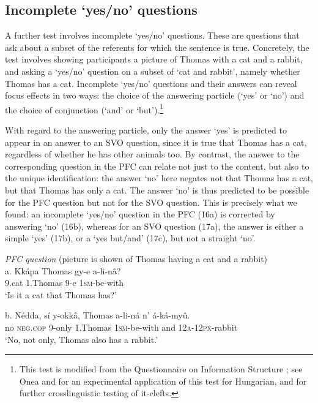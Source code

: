 \documentclass[output=paper]{langsci/langscibook}
\begin{document}
\subsection{Incomplete ‘yes/no’ questions} %

A further test involves incomplete ‘yes/no’ questions. These are questions that ask about a subset of the referents for which the sentence is true. Concretely, the test involves showing participants a picture of Thomas with a cat and a rabbit, and asking a ‘yes/no’ question on a subset of ‘cat and rabbit’, namely whether Thomas has a cat. Incomplete ‘yes/no’ questions and their answers can reveal focus effects in two ways: the choice of the answering particle (‘yes’ or ‘no’) and the choice of conjunction (‘and’ or ‘but’).\footnote{This test is modified from the Questionnaire on Information Structure \citep{SkopeteasEtAl2006}; see Onea and \citet{Beaver2011} for an experimental application of this test for Hungarian, and \citet{DestruelEtAl2014} for further crosslinguistic testing of it-clefts.}

  With regard to the answering particle, only the answer ‘yes’ is predicted to appear in an answer to an SVO question, since it is true that Thomas has a cat, regardless of whether he has other animals too. By contrast, the answer to the corresponding question in the PFC can relate not just to the content, but also to the unique identification: the answer ‘no’ here negates not that Thomas has a cat, but that Thomas has only a cat. The answer ‘no’ is thus predicted to be possible for the PFC question but not for the SVO question. This is precisely what we found: an incomplete ‘yes/no’ question in the PFC (16a) is corrected by answering ‘no’ (16b), whereas for an SVO question (17a), the answer is either a simple ‘yes’ (17b), or a ‘yes but/and’ (17c), but not a straight ‘no’. 

\ea
{\textit{PFC question}}
       (picture is shown of Thomas having a cat and a rabbit)\\
\gll   a.  Kkápa  Thomas  gy-e  a-li-nâ?\\
         9.cat  1.Thomas  9-e  \textsc{1sm}-be-with\\
\glt     ‘Is it a cat that Thomas has?’
\z

\ea
\gll   b.  Nédda,  sí    y-okkâ,  Thomas  a-li-ná    n’  á-ká-myû.\\
         no  \textsc{neg}.\textsc{cop}  9-only  1.Thomas  \textsc{1sm}-be-with  and  \textsc{12a}-\textsc{12px}-rabbit\\
\glt     ‘No, not only, Thomas also has a rabbit.’
\z
\end{document}
